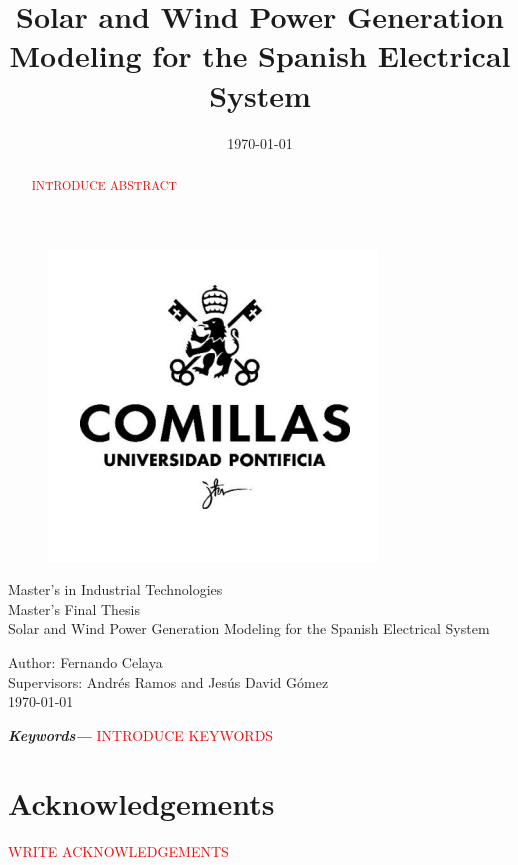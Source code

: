 \documentclass[12pt,a4paper,twoside]{article}
\title{Solar and Wind Power Generation Modeling for the Spanish Electrical System}
\date{\today}
\providecommand{\keywords}[1]
{
  \small	
  \textbf{\textit{Keywords---}} #1
}
\begin{document}
\pagestyle{empty}
\begin{titlepage}
  \begin{figure}
    \centering
    \includegraphics[width=0.3\linewidth]{assets/logo-comillas.png}
  \end{figure}
  \centering
  \Large 
  Master's in Industrial Technologies \\ Master's Final Thesis\\[36px]
  \Huge 
  Solar and Wind Power Generation Modeling for the Spanish Electrical System\\
  \Large
  \raggedright
  \vspace*{\fill}
  Author: Fernando Celaya\\
  Supervisors: Andrés Ramos and Jesús David Gómez\\
  \today

\end{titlepage}
\newpage

\begin{abstract}
  \textcolor{red}{INTRODUCE ABSTRACT}
\end{abstract}
\keywords{\textcolor{red}{INTRODUCE KEYWORDS}}
\newpage

\section*{Acknowledgements}
\textcolor{red}{WRITE ACKNOWLEDGEMENTS} 
\newpage

\thispagestyle{empty}
\tableofcontents
\newpage

\thispagestyle{empty}
\listoffigures
\listoftables
\newpage


\pagestyle{plain}
\clearpage
{} 

\newpage

\newpage

\newpage

\newpage

\newpage

\newpage
\begin{appendices}

\newpage

\newpage
\end{appendices}

\printbibliography[heading=bibintoc]
\end{document}
